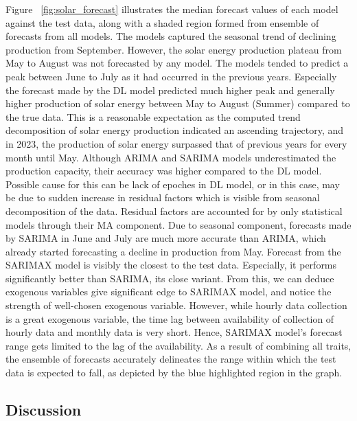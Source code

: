 \documentclass[acmtog]{acmart}
\begin{document}
Figure ~\ref{fig:solar_forecast} illustrates the median forecast values of each model against the test data, along with a shaded region formed from ensemble of forecasts from all models. The models captured the seasonal trend of declining production from September. However, the solar energy production plateau from May to August was not forecasted by any model. The models tended to predict a peak between June to July as it had occurred in the previous years. Especially the forecast made by the DL model predicted much higher peak and generally higher production of solar energy between May to August (Summer) compared to the true data. This is a reasonable expectation as the computed trend decomposition of solar energy production indicated an ascending trajectory, and in 2023, the production of solar energy surpassed that of previous years for every month until May. Although ARIMA and SARIMA models underestimated the production capacity, their accuracy was higher compared to the DL model. Possible cause for this can be lack of epoches in DL model, or in this case, may be due to sudden increase in residual factors which is visible from seasonal decomposition of the data. Residual factors are accounted for by only statistical models through their MA component. Due to seasonal component, forecasts made by SARIMA in June and July are much more accurate than ARIMA, which already started forecasting a decline in production from May. Forecast from the SARIMAX model is visibly the closest to the test data. Especially, it performs significantly better than SARIMA, its close variant. From this, we can deduce exogenous variables give significant edge to SARIMAX model, and notice the strength of well-chosen exogenous variable. However, while hourly data collection is a great exogenous variable, the time lag between availability of collection of hourly data and monthly data is very short. Hence, SARIMAX model's forecast range gets limited to the lag of the availability. As a result of combining all traits, the ensemble of forecasts accurately delineates the range within which the test data is expected to fall, as depicted by the blue highlighted region in the graph.


\subsection{Discussion}
\end{document}
